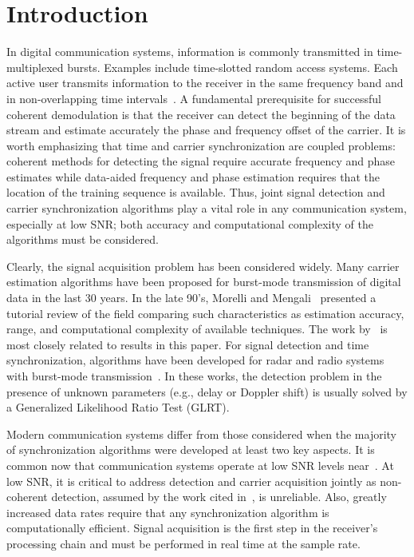 \section{Introduction}
\label{sec:introduction}

In digital communication systems, information is commonly transmitted in time-multiplexed bursts.
Examples include time-slotted random access systems. Each active user transmits information to the receiver
in the same frequency band and in non-overlapping time intervals~\cite{Falconer_95}. 
A fundamental prerequisite for successful coherent demodulation is that the receiver can
detect the beginning of the data stream and estimate accurately the phase and frequency offset of the carrier.
It is worth emphasizing that time and carrier synchronization are coupled problems:
coherent methods for detecting the signal require accurate frequency and phase estimates while
data-aided frequency and phase estimation requires that the location of the training sequence is available.
Thus, joint signal detection and carrier synchronization algorithms play a vital role in any communication system, especially at low SNR;
both accuracy and computational complexity of the algorithms must be considered.

Clearly, the signal acquisition problem has been considered widely. 
Many carrier estimation algorithms have been proposed for burst-mode
transmission of digital data in the last 30 years.
In the late 90's, Morelli and Mengali~\cite{Morelli_Mengali_98} presented a tutorial review of the field
comparing such characteristics as estimation accuracy, range, and computational complexity of available techniques.
The work by~\cite{Rife_Boorstyn_74,Tretter_85,Kay_89,Luise_Reggiannini_95,Fitz_94,Mengali_Morelli_97} is most
closely related to results in this paper. 
For signal detection and time synchronization, algorithms have been developed for radar and radio
systems with burst-mode transmission~\cite{Kumari_15,Liu_Wei_15,Grossi_Lops_18, Bolisetti_11,Cui_Kong_09,Kumar_Dwivedi_16}.
In these works, the detection problem in the presence of unknown
parameters (e.g., delay or Doppler shift) is usually solved by a Generalized Likelihood Ratio Test (GLRT).

Modern communication systems differ from those considered when the majority of synchronization algorithms were 
developed at least two key aspects. 
It is common now that communication systems operate at low SNR levels near~\dB.
At low SNR, it is critical to address detection and carrier acquisition jointly as non-coherent detection, assumed
by the work cited in~\cite{Morelli_Mengali_98}, is unreliable.
Also, greatly increased data rates require that any synchronization algorithm is computationally efficient.
Signal acquisition is the first step in the receiver's processing chain and must be performed in real time at the sample rate.

